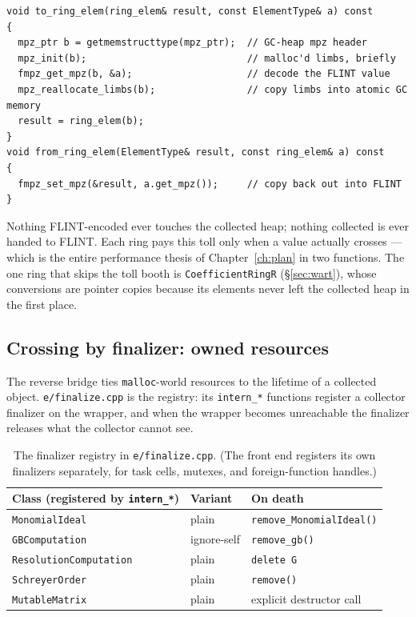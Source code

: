 \documentclass[11pt,oneside]{report}
\newcommand{\code}[1]{\textcolor{m2code}{\texttt{#1}}}
\newcommand{\file}[1]{\textcolor{m2file}{\texttt{#1}}}
\begin{document}
\begin{lstlisting}
void to_ring_elem(ring_elem& result, const ElementType& a) const
{
  mpz_ptr b = getmemstructtype(mpz_ptr);  // GC-heap mpz header
  mpz_init(b);                            // malloc'd limbs, briefly
  fmpz_get_mpz(b, &a);                    // decode the FLINT value
  mpz_reallocate_limbs(b);                // copy limbs into atomic GC memory
  result = ring_elem(b);
}
void from_ring_elem(ElementType& result, const ring_elem& a) const
{
  fmpz_set_mpz(&result, a.get_mpz());     // copy back out into FLINT
}
\end{lstlisting}

\noindent Nothing FLINT-encoded ever touches the collected heap; nothing
collected is ever handed to FLINT. Each ring pays this toll only when a
value actually crosses --- which is the entire performance thesis of
Chapter~\ref{ch:plan} in two functions. The one ring that skips the toll
booth is \code{CoefficientRingR} (\S\ref{sec:wart}), whose conversions are
pointer copies because its elements never left the collected heap in the
first place.

\subsection{Crossing by finalizer: owned resources}
\label{sec:finalizers}

The reverse bridge ties \code{malloc}-world resources to the lifetime of a
collected object. \file{e/finalize.cpp} is the registry: its
\code{intern\_*} functions register a collector finalizer on the wrapper,
and when the wrapper becomes unreachable the finalizer releases what the
collector cannot see.

\begin{table}[htbp]
\centering\small
{}
\begin{tabular}{@{}lll@{}}
\toprule
\textbf{Class (registered by \code{intern\_*})} & \textbf{Variant} & \textbf{On death} \\
\midrule
\code{MonomialIdeal} & plain & \code{remove\_MonomialIdeal()} \\
\code{GBComputation} & ignore-self & \code{remove\_gb()} \\
\code{ResolutionComputation} & plain & \code{delete G} \\
\code{SchreyerOrder} & plain & \code{remove()} \\
\code{MutableMatrix} & plain & explicit destructor call \\
\bottomrule
\end{tabular}
\caption{The finalizer registry in \file{e/finalize.cpp}. (The front end
registers its own finalizers separately, for task cells, mutexes, and
foreign-function handles.)}
\label{tab:finalizers}
\end{table}
\end{document}
